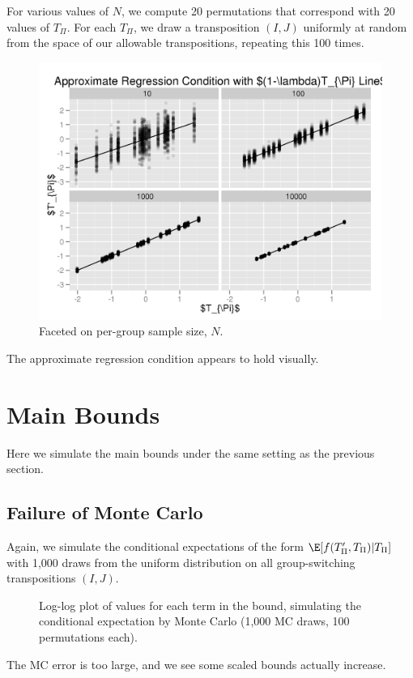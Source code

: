 For various values of $N$, we compute 20 permutations that correspond with 20 values of $T_{\Pi}$.
For each $T_{\Pi}$, we draw a transposition $(I, J)$ uniformly at random from the space of our
allowable transpositions, repeating this 100 times.  
\begin{figure}[!ht]
  \centering
  \includegraphics[scale = .75]{sim7.png}
  \caption{Faceted on per-group sample size, $N$.}
\end{figure}

The approximate regression condition appears to hold visually.
\clearpage

\section{Main Bounds}
Here we simulate the main bounds under the same setting as the previous section.  
\subsection{Failure of Monte Carlo}
Again, we simulate the conditional expectations of the form $\E[f(T'_{\Pi}, T_{\Pi}) | T_{\Pi}]$
with 1,000 draws from the uniform distribution on all group-switching transpositions $(I, J)$.

\begin{figure}[!ht]
  \centering
  
  \caption{Log-log plot of values for each term in the bound, simulating the conditional expectation
    by Monte Carlo (1,000 MC draws, 100 permutations each).}
\end{figure}
The MC error is too large, and we see some scaled bounds actually increase.
\clearpage

